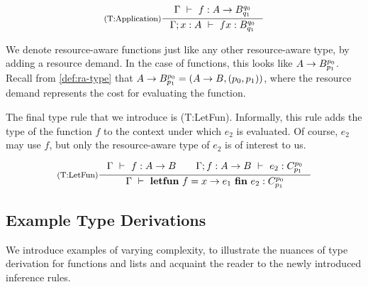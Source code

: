 \[
   \inference[(T:Application)]
   {\typing{\Gamma}{f}{A \to \ratype{B}{q_0}{q_1}}}
   {\typing{\Gamma;x:A}{f x}{\ratype{B}{q_0}{q_1}}}
\]

\begin{remark}
   We denote resource-aware functions just like any other resource-aware type, by adding a resource demand. In the case of functions, this looks like \(A \to B ^{p_0}_{p_1}\). Recall from \cref{def:ra-type} that \(A \to B ^{p_0}_{p_1} = (A \to B, (p_0, p_1))\), where the resource demand represents the cost for evaluating the function.
\end{remark}

The final type rule that we introduce is (T:LetFun). Informally, this rule adds the type of the function \(f\) to the context under which \(e_2\) is evaluated. Of course, \(e_2\) may use \(f\), but only the resource-aware type of \(e_2\) is of interest to us.

\[
   \inference[(T:LetFun)]
   {\typing{\Gamma}{f}{A \to B} \qquad \typing{\Gamma; f : A \to B}{e_2}{\ratype{C}{p_0}{p_1}}}
   {\typing{\Gamma}{\letFun{f}{x}{e_1}{e_2}}{\ratype{C}{p_0}{p_1}}}
\]

\subsection{Example Type Derivations}\label{sec:example-type-derivations}

We introduce examples of varying complexity, to illustrate the nuances of type derivation for functions and lists and acquaint the reader to the newly introduced inference rules.

